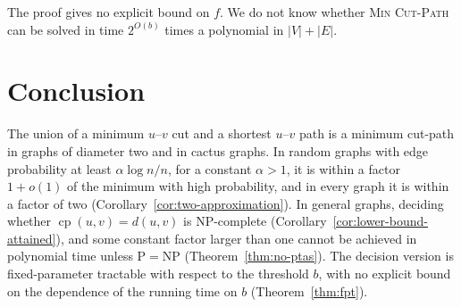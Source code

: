 \documentclass[a4paper,fleqn]{cas-sc}
\numberwithin{equation}{section}
\theoremstyle{definition}
\theoremstyle{plain}
\theoremstyle{remark}
\newcommand{\cp}{\operatorname{cp}}                  %
\newcommand{\MinCutPath}{\textsc{Min Cut-Path}}
\begin{document}
The proof gives no explicit bound on $f$.
We do not know whether \MinCutPath{} can be solved in time $2^{O(b)}$ times a polynomial in $|V| + |E|$.

\section{Conclusion}
\label{sec:conclusion}

The union of a minimum $u$--$v$ cut and a shortest $u$--$v$ path is a minimum cut-path in graphs of diameter two and in cactus graphs.
In random graphs with edge probability at least $\alpha \log n / n$, for a constant $\alpha > 1$, it is within a factor $1 + o(1)$ of the minimum with high probability, and in every graph it is within a factor of two (Corollary~\ref{cor:two-approximation}).
In general graphs, deciding whether $\cp(u, v) = d(u, v)$ is NP-complete (Corollary~\ref{cor:lower-bound-attained}), and some constant factor larger than one cannot be achieved in polynomial time unless $\mathrm{P} = \mathrm{NP}$ (Theorem~\ref{thm:no-ptas}).
The decision version is fixed-parameter tractable with respect to the threshold $b$, with no explicit bound on the dependence of the running time on $b$ (Theorem~\ref{thm:fpt}).
\end{document}
